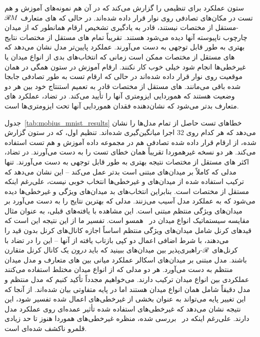 \begin{table}
{		ستون  عملکرد برای تنظیمی را گزارش می‌کند که در آن هم نمونه‌های آموزش و هم تست در مکان‌های تصادفی روی نوار قرار داده شده‌اند.
		در حالی که های متعارف $\mathscr{R}\mkern-1.8muM$-مستقل از مختصات نیستند، قادر به یادگیری تشخیص ارقام همانطور که از میدان چارچوب ناپیوسته آنها دیده می‌شود هستند.
		تقریباً تمام های مستقل از مختصات نتایج بهتری به طور قابل توجهی به دست می‌آورند.
		عملکرد پایین‌تر مدل  نشان می‌دهد که های مستقل از مختصات ممکن است زمانی که انتخاب‌های بدی از انواع میدان یا غیرخطی‌ها انجام شود خیلی خوب کار نکنند.
		ارقام آموزش در ستون  همگی در همان موقعیت روی نوار قرار داده شده‌اند در حالی که ارقام تست به طور تصادفی جابجا شده باقی می‌مانند.
		های مستقل از مختصات قادر به تعمیم استنتاج خود بین هر دو وضعیت هستند که هموردایی ایزومتری آنها را تأیید می‌کند.
		در تضاد، عملکرد های متعارف بدتر می‌شود که نشان‌دهنده فقدان هموردایی آنها تحت ایزومتری‌ها است.
	}
	\label{tab:mobius_mnist_results}
\end{table}

جدول~\ref{tab:mobius_mnist_results} خطاهای تست حاصل از تمام مدل‌ها را نشان می‌دهد که هر کدام روی $32$ اجرا میانگین‌گیری شده‌اند.
تنظیم اول، که در ستون  گزارش شده، از ارقام قرار داده شده تصادفی هم در مجموعه داده آموزش و هم تست استفاده می‌کند.
هر دو نسخه  غیرهموردا تقریباً همان خطای تست را به دست می‌آورند.
در تضاد، اکثر های مستقل از مختصات نتیجه بهتری به طور قابل توجهی به دست می‌آورند.
تنها مدلی که کاملاً بر میدان‌های  مبتنی است بدتر عمل می‌کند -- این نشان می‌دهد که ترکیب استفاده شده از میدان‌های  و غیرخطی‌ها انتخاب خوبی نیست، علی‌رغم اینکه مستقل از مختصات است.
بنابراین انتخاب‌های بد میدان‌های ویژگی و غیرخطی‌ها دیده می‌شود که به عملکرد مدل آسیب می‌زنند.
مدلی که بهترین نتایج را به دست می‌آورد بر میدان‌های ویژگی منتظم مبتنی است.
این مشاهده با یافته‌های قبلی، به عنوان مثال مقایسه سیستماتیک انواع میدان در~\cite{Weiler2019_E2CNN} همسو است.
تفسیر ما از این نتیجه این است که قیدهای کرنل شامل میدان‌های ویژگی منتظم اساساً اجازه کانال‌های کرنل بدون قید را می‌دهند، با شرط اضافی اعمال دو کپی بازتاب یافته از آنها -- این را در تضاد با کرنل‌های $\mathscr{R}$-راهبری‌پذیر بین میدان‌های  ببینید که باید \emph{درون} یک کانال کرنل متقارن باشند.
مدل مبتنی بر میدان‌های اسکالر عملکرد میانی بین های متعارف و مدل میدان منتظم به دست می‌آورد.
هر دو مدلی که از انواع میدان مختلط استفاده می‌کنند عملکردی بین انواع میدان ترکیب دارند.
می‌خواهیم مجدداً تأکید کنیم که مدل منتظم و مدل  دقیقاً شامل همان انواع میدان  هستند اما در پایه متفاوتی بیان شده‌اند.
از آنجا که این تغییر پایه می‌تواند به عنوان بخشی از غیرخطی‌های اعمال شده تفسیر شود، این نتیجه نشان می‌دهد که غیرخطی‌های استفاده شده تأثیر عمده‌ای روی عملکرد مدل دارند.
علی‌رغم اینکه در~\cite{Weiler2019_E2CNN} بررسی شده، منظره غیرخطی‌های هموردا هنوز تا حد زیادی قلمرو ناکشف شده‌ای است.

